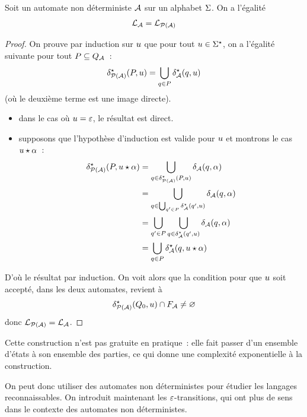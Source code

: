 \begin{proposition}
  Soit un automate non déterministe $\mathcal{A}$ sur un alphabet $\Sigma$. On a
  l'égalité
  \[\mathcal L_{\mathcal{A}} = \mathcal L_{\mathcal{P}(\mathcal{A})}\]
\end{proposition}

\begin{proof}
  On prouve par induction sur $u$ que pour tout $u \in \Sigma^{\star}$, on a
  l'égalité suivante pour tout $P \subseteq Q_{\mathcal{A}}$~:
  \[\delta_{\mathcal{P}(\mathcal{A})}^{\star}(P,u) =
  \bigcup_{q_{} \in P}\delta_{\mathcal{A}}^{\star}(q,u)\]
  (où le deuxième terme est une image directe).
  \begin{itemize}
  \item dans le cas où $u = \varepsilon$, le résultat est direct.
  \item supposons que l'hypothèse d'induction est valide pour $u$ et
    montrons le cas $u\mathbin{\star}\alpha$~:
    \begin{align*}
      \delta_{\mathcal{P}(\mathcal{A})}^{\star}(P,u\mathbin{\star}\alpha) &=
      \bigcup_{q_{} \in \delta_{\mathcal{P}(\mathcal{A})}^{\star}(P,u)}
      \delta_{\mathcal{A}}(q_{},\alpha)\\
      &= \bigcup_{q_{} \in \bigcup_{q_{}' \in P}\delta_{\mathcal{A}}^{\star}(q_{}',u)}
      \delta_{\mathcal{A}}(q_{},\alpha)\\
      &= \bigcup_{q_{}' \in P}\bigcup_{q_{} \in \delta_{\mathcal{A}}^{\star}(q_{}',u)}
      \delta_{\mathcal{A}}(q_{},\alpha)\\
      &= \bigcup_{q_{} \in P}\delta_{\mathcal{A}}^{\star}(q_{},u\mathbin{\star}\alpha)
    \end{align*}
  \end{itemize}
  D'où le résultat par induction. On voit alors que la condition pour que
  $u$ soit accepté, dans les deux automates, revient à
  \[\delta_{\mathcal{P}(\mathcal{A})}^{\star} (Q_{0},u) \cap F_{\mathcal{A}} \neq \varnothing\]
  donc $\mathcal L_{\mathcal{P}(\mathcal{A})} = \mathcal L_{\mathcal{A}}$.
\end{proof}

\begin{remark}
  Cette construction n'est pas gratuite en pratique~: elle fait passer d'un
  ensemble d'états à son ensemble des parties, ce qui donne une complexité
  exponentielle à la construction.
\end{remark}

On peut donc utiliser des automates non déterministes pour étudier les langages
reconnaissables. On introduit maintenant les $\varepsilon$-transitions, qui
ont plus de sens dans le contexte des automates non déterministes.

